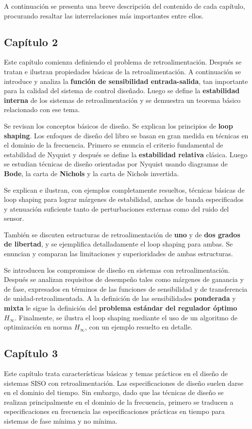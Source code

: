 A continuación se presenta una breve descripción del contenido de cada capítulo, procurando resaltar las interrelaciones más importantes entre ellos.

\subsection{Capítulo 2}
Este capítulo comienza definiendo el problema de retroalimentación. Después se tratan e ilustran propiedades básicas de la retroalimentación. A continuación se introduce y analiza la \textbf{función de sensibilidad entrada-salida}, tan importante para la calidad del sistema de control diseñado. Luego se define la \textbf{estabilidad interna} de los sistemas de retroalimentación y se demuestra un teorema básico relacionado con ese tema.

Se revisan los conceptos básicos de diseño. Se explican los principios de \textbf{loop shaping}. Los enfoques de diseño del libro se basan en gran medida en técnicas en el dominio de la frecuencia. Primero se enuncia el criterio fundamental de estabilidad de Nyquist y después se define la \textbf{estabilidad relativa} clásica. Luego se estudian técnicas de diseño orientadas por Nyquist usando diagramas de \textbf{Bode}, la carta de \textbf{Nichols} y la carta de Nichols invertida.

Se explican e ilustran, con ejemplos completamente resueltos, técnicas básicas de loop shaping para lograr márgenes de estabilidad, anchos de banda especificados y atenuación suficiente tanto de perturbaciones externas como del ruido del sensor.

También se discuten estructuras de retroalimentación de \textbf{uno} y de \textbf{dos grados de libertad}, y se ejemplifica detalladamente el loop shaping para ambas. Se enuncian y comparan las limitaciones y superioridades de ambas estructuras.

Se introducen los compromisos de diseño en sistemas con retroalimentación. Después se analizan requisitos de desempeño tales como márgenes de ganancia y de fase, expresados en términos de las funciones de sensibilidad y de transferencia de unidad-retroalimentada. A la definición de las sensibilidades \textbf{ponderada} y \textbf{mixta} le sigue la definición del \textbf{problema estándar del regulador óptimo \(H_{\infty}\)}. Finalmente, se ilustra el loop shaping mediante el uso de un algoritmo de optimización en norma \(H_{\infty}\), con un ejemplo resuelto en detalle.

\subsection{Capítulo 3}
Este capítulo trata características básicas y temas prácticos en el diseño de sistemas SISO con retroalimentación. Las especificaciones de diseño suelen darse en el dominio del tiempo. Sin embargo, dado que las técnicas de diseño se realizan principalmente en el dominio de la frecuencia, primero se traducen a especificaciones en frecuencia las especificaciones prácticas en tiempo para sistemas de fase mínima y no mínima.

